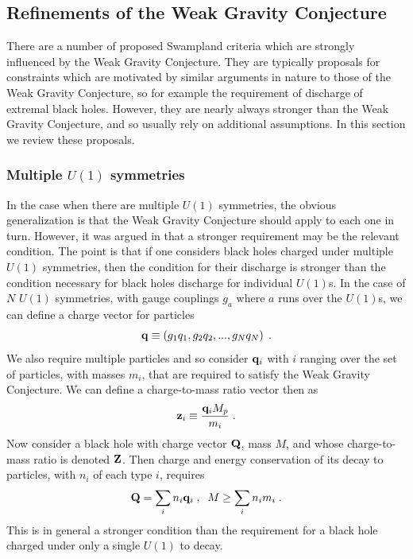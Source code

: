 \documentclass[11pt,a4paper]{article}
\numberwithin{equation}{section}
\numberwithin{table}{section}\setlength{\multlinegap}{25pt}
\newcommand{\be}{\begin{equation}}
\newcommand{\ee}{\end{equation}}
\begin{document}
\subsection{Refinements of the Weak Gravity Conjecture}

There are a number of proposed Swampland criteria which are strongly influenced by the Weak Gravity Conjecture. They are typically proposals for constraints which are motivated by similar arguments in nature to those of the Weak Gravity Conjecture, so for example the requirement of discharge of extremal black holes. However, they are nearly always stronger than the Weak Gravity Conjecture, and so usually rely on additional assumptions. In this section we review these proposals. 

\subsubsection{Multiple $U(1)$ symmetries}
\label{sec:multiu1}

In the case when there are multiple $U(1)$ symmetries, the obvious generalization is that the Weak Gravity Conjecture should apply to each one in turn. However, it was argued in \cite{Cheung:2014vva} that a stronger requirement may be the relevant condition. The point is that if one considers black holes charged under multiple $U(1)$ symmetries, then the condition for their discharge is stronger than the condition necessary for black holes discharge for individual $U(1)$s. In the case of $N$ $U(1)$ symmetries, with gauge couplings $g_a$ where $a$ runs over the $U(1)$s, we can define a charge vector for particles
\be
{\bf q} \equiv \left( g_1 q_1, g_2 q_2, ... , g_N q_N \right) \;.
\ee
We also require multiple particles and so consider ${\bf q}_i$ with $i$ ranging over the set of particles, with masses $m_i$, that are required to satisfy the Weak Gravity Conjecture. We can define a charge-to-mass ratio vector then as
\be
\label{ctmrz}
{\bf z}_i \equiv \frac{{\bf q}_i M_p}{m_i} \;.
\ee
Now consider a black hole with charge vector ${\bf Q}$, mass $M$, and whose charge-to-mass ratio is denoted ${\bf Z}$. Then charge and energy conservation of its decay to particles, with $n_i$ of each type $i$, requires 
\be
{\bf Q} = \sum_i n_i {\bf q}_i \;,\;\; M \geq \sum_i n_i m_i \;.
\ee
This is in general a stronger condition than the requirement for a black hole charged under only a single $U(1)$ to decay. 
\end{document}
